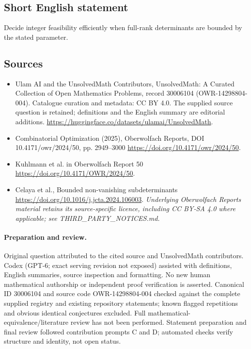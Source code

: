 \documentclass[11pt]{article}
\begin{document}
\subsection{Short English statement}
Decide integer feasibility efficiently when full-rank determinants are bounded by the stated parameter.
\subsection{Sources}
\begin{itemize}
\item[\hypertarget{source:30006104:1}{S1}] Ulam AI and the UnsolvedMath Contributors, UnsolvedMath: A Curated Collection of Open Mathematics Problems, record 30006104 (OWR-14298804-004). Catalogue curation and metadata: CC BY 4.0. The supplied source question is retained; definitions and the English summary are editorial additions.
\url{https://huggingface.co/datasets/ulamai/UnsolvedMath}.
\item[\hypertarget{source:30006104:2}{S2}] Combinatorial Optimization (2025), Oberwolfach Reports, DOI 10.4171/owr/2024/50, pp. 2949--3000
\url{https://doi.org/10.4171/owr/2024/50}.
\item[\hypertarget{source:30006104:3}{S3}] Kuhlmann et al. in Oberwolfach Report 50
\url{https://doi.org/10.4171/OWR/2024/50}.
\item[\hypertarget{source:30006104:4}{S4}] Celaya et al., Bounded non-vanishing subdeterminants
\url{https://doi.org/10.1016/j.jcta.2024.106003}.
\textit{Underlying Oberwolfach Reports material retains its source-specific licence, including CC BY-SA 4.0 where applicable; see THIRD\_PARTY\_NOTICES.md.}
\end{itemize}
\paragraph{Preparation and review.}
Original question attributed to the cited source and UnsolvedMath contributors. Codex (GPT-6; exact serving revision not exposed) assisted with definitions, English summaries, source inspection and formatting. No new human mathematical authorship or independent proof verification is asserted. Canonical ID 30006104 and source code OWR-14298804-004 checked against the complete supplied registry and existing repository statements; known flagged repetitions and obvious identical conjectures excluded. Full mathematical-equivalence/literature review has not been performed. Statement preparation and final review followed contribution prompts C and D; automated checks verify structure and identity, not open status.
\label{end:30006104}
\end{document}
